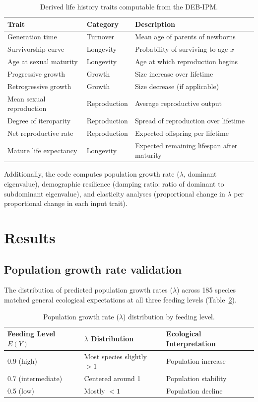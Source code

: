 \documentclass[11pt]{article}
\begin{document}
\begin{table}[ht]
\centering
\caption{Derived life history traits computable from the DEB-IPM.}
\label{tab:derived}
\begin{tabular}{lll}
\toprule
Trait & Category & Description \\
\midrule
Generation time & Turnover & Mean age of parents of newborns \\
Survivorship curve & Longevity & Probability of surviving to age $x$ \\
Age at sexual maturity & Longevity & Age at which reproduction begins \\
Progressive growth & Growth & Size increase over lifetime \\
Retrogressive growth & Growth & Size decrease (if applicable) \\
Mean sexual reproduction & Reproduction & Average reproductive output \\
Degree of iteroparity & Reproduction & Spread of reproduction over lifetime \\
Net reproductive rate & Reproduction & Expected offspring per lifetime \\
Mature life expectancy & Longevity & Expected remaining lifespan after maturity \\
\bottomrule
\end{tabular}
\end{table}

Additionally, the code computes population growth rate ($\lambda$, dominant eigenvalue), demographic resilience (damping ratio: ratio of dominant to subdominant eigenvalue), and elasticity analyses (proportional change in $\lambda$ per proportional change in each input trait).

\section{Results}

\subsection{Population growth rate validation}

The distribution of predicted population growth rates ($\lambda$) across 185 species matched general ecological expectations at all three feeding levels (Table~\ref{tab:lambda}).

\begin{table}[ht]
\centering
\caption{Population growth rate ($\lambda$) distribution by feeding level.}
\label{tab:lambda}
\begin{tabular}{lll}
\toprule
Feeding Level $E(Y)$ & $\lambda$ Distribution & Ecological Interpretation \\
\midrule
0.9 (high) & Most species slightly $> 1$ & Population increase \\
0.7 (intermediate) & Centered around 1 & Population stability \\
0.5 (low) & Mostly $< 1$ & Population decline \\
\bottomrule
\end{tabular}
\end{table}
\end{document}
